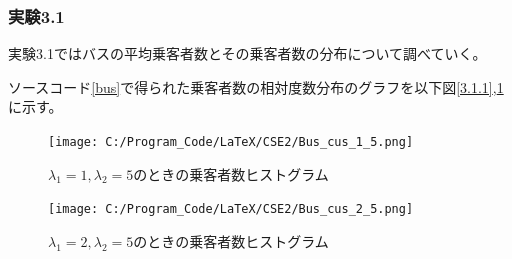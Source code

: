 \documentclass[a4paper,11pt,dvipdfmx]{jsarticle}
\begin{document}
\subsubsection{実験3.1}
実験3.1ではバスの平均乗客者数とその乗客者数の分布について調べていく。

ソースコード\ref{bus}で得られた乗客者数の相対度数分布のグラフを以下図\ref{3.1.1},\ref{3.1.2}に示す。
\begin{figure}[h]
    \begin{minipage}[b]{0.48\columnwidth}
      \centering
      \texttt{[image: C:/Program\_Code/LaTeX/CSE2/Bus\_cus\_1\_5.png]}
      \caption{$\lambda_1=1,\lambda_2=5$のときの乗客者数ヒストグラム}
      \label{3.1.1}
    \end{minipage}
    \hspace{0.04\columnwidth} 
    \begin{minipage}[b]{0.48\columnwidth}
      \centering
      \texttt{[image: C:/Program\_Code/LaTeX/CSE2/Bus\_cus\_2\_5.png]}
      \caption{$\lambda_1=2,\lambda_2=5$のときの乗客者数ヒストグラム}
      \label{3.1.2}
    \end{minipage}
  \end{figure}
\end{document}
